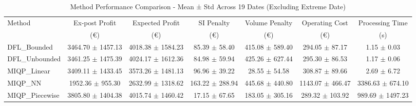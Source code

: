 \begin{table}[h]
\centering
\caption{Method Performance Comparison - Mean ± Std Across 19 Dates (Excluding Extreme Date)}
\label{tab:method_comparison}
\begin{tabular}{lcccccc}
\toprule
Method & Ex-post Profit & Expected Profit & SI Penalty & Volume Penalty & Operating Cost & Processing Time \\
 & (€) & (€) & (€) & (€) & (€) & (s) \\
\midrule
DFL\_Bounded & 3464.70 $\pm$ 1457.13 & 4018.38 $\pm$ 1584.23 & 85.39 $\pm$ 58.40 & 415.08 $\pm$ 589.40 & 294.05 $\pm$ 87.17 & 1.15 $\pm$ 0.03 \\
DFL\_Unbounded & 3461.25 $\pm$ 1475.39 & 4024.17 $\pm$ 1612.36 & 84.98 $\pm$ 59.94 & 425.26 $\pm$ 627.44 & 295.30 $\pm$ 86.53 & 1.17 $\pm$ 0.06 \\
MIQP\_Linear & 3409.11 $\pm$ 1433.45 & 3573.26 $\pm$ 1481.13 & 96.96 $\pm$ 39.22 & 28.55 $\pm$ 54.58 & 308.87 $\pm$ 89.66 & 2.69 $\pm$ 6.72 \\
MIQP\_NN & 1952.36 $\pm$ 955.30 & 2632.99 $\pm$ 1318.62 & 163.22 $\pm$ 288.94 & 445.68 $\pm$ 440.80 & 1143.07 $\pm$ 466.47 & 3386.63 $\pm$ 674.10 \\
MIQP\_Piecewise & 3805.80 $\pm$ 1404.38 & 4015.74 $\pm$ 1460.42 & 17.15 $\pm$ 67.65 & 183.05 $\pm$ 305.16 & 289.32 $\pm$ 103.92 & 989.69 $\pm$ 1497.23 \\
\bottomrule
\end{tabular}
\end{table}
